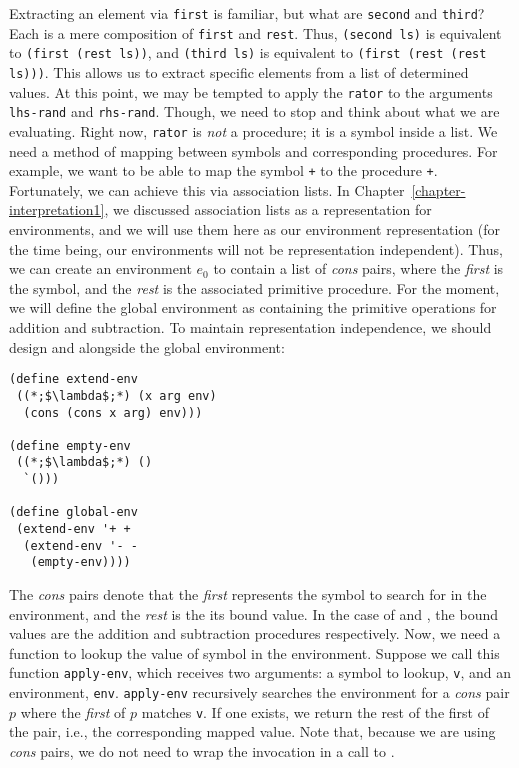 Extracting an element via \texttt{first} is familiar, but what are \texttt{second} and \texttt{third}? Each is a mere composition of \texttt{first} and \texttt{rest}. Thus, \texttt{(second ls)} is equivalent to \texttt{(first (rest ls))}, and \texttt{(third ls)} is equivalent to \texttt{(first (rest (rest ls)))}. This allows us to extract specific elements from a list of determined values. At this point, we may be tempted to apply the \texttt{rator} to the arguments \texttt{lhs-rand} and \texttt{rhs-rand}. Though, we need to stop and think about what we are evaluating. Right now, \texttt{rator} is \textit{not} a procedure; it is a symbol inside a list. We need a method of mapping between symbols and corresponding procedures. For example, we want to be able to map the symbol \texttt{\textquotesingle{}+} to the procedure \texttt{+}. Fortunately, we can achieve this via association lists. In Chapter~\ref{chapter-interpretation1}, we discussed association lists as a representation for environments, and we will use them here as our environment representation (for the time being, our environments will not be representation independent). Thus, we can create an environment $e_0$ to contain a list of \textit{cons} pairs, where the \textit{first} is the symbol, and the \textit{rest} is the associated primitive procedure. For the moment, we will define the global environment as containing the primitive operations for addition and subtraction. To maintain representation independence, we should design  and  alongside the global environment:
\begin{cl}[]{}\begin{lstlisting}[language=MyScheme]
(define extend-env
 ((*;$\lambda$;*) (x arg env)
  (cons (cons x arg) env)))

(define empty-env
 ((*;$\lambda$;*) ()
  `()))

(define global-env
 (extend-env '+ +
  (extend-env '- -
   (empty-env))))
\end{lstlisting}\end{cl}
The \textit{cons} pairs denote that the \textit{first} represents the symbol to search for in the environment, and the \textit{rest} is the its bound value. In the case of \ttt{\q{}+} and \ttt{\q{}-}, the bound values are the addition and subtraction procedures respectively. Now, we need a function to lookup the value of symbol in the environment. Suppose we call this function \texttt{apply-env}, which receives two arguments: a symbol to lookup, \texttt{v}, and an environment, \texttt{env}. \texttt{apply-env} recursively searches the environment for a \textit{cons} pair $p$ where the \textit{first} of $p$ matches \texttt{v}. If one exists, we return the rest of the first of the pair, i.e., the corresponding mapped value. Note that, because we are using \textit{cons} pairs, we do not need to wrap the  invocation in a call to .

